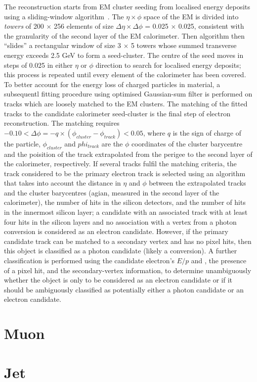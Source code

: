 The reconstruction starts from EM cluster seeding from localised energy deposits 
using a sliding-window algorithm~\cite{sliding-window}.
The $\eta \times \phi$ space of the EM is divided into \textit{towers} of 200 $\times$ 256
elements of size $\Delta\eta \times \Delta\phi$ = 0.025 $\times$ 0.025, consistent with the
granularity of the second layer of the EM calorimeter. Then algorithm then ``slides'' a rectangular
window of size 3 $\times$ 5 towers whose summed transverse energy exceeds 2.5 GeV to form a seed-cluster.
The centre of the seed moves in steps of 0.025 in either $\eta$ or $\phi$ direction to search for localised
energy deposits; this process is repeated until every element of the calorimeter has been covered.
To better account for the energy loss of charged particles in material, a subsequentl fitting procedure
using optimised Gaussian-sum filter \cite{ATLAS-CONF-2012-047} is performed on tracks which are loosely 
matched to the EM clusters. The matching of the fitted tracks to the candidate calorimeter seed-cluster
is the final step of electron reconstruction. 
The matching requires $-0.10 < \Delta\phi = -q \times (\phi_{cluster} - \phi_{track}) < 0.05$, 
where $q$ is the sign of charge of the particle, $\phi_{cluster}$ and $phi_{track}$ are the 
$\phi$ coordinates of the cluster barycentre and the poisition of the track extrapolated from the 
perigee to the second layer of the calorimeter, respectively. 
If several tracks fulfil the matching criteria, the track considered to
be the primary electron track is selected using an algorithm that takes into account the distance in $\eta$
and $\phi$ between the extrapolated tracks and the cluster barycentres (agian, measured in the second layer of the
calorimeter), 
the number of hits in the silicon detectors, 
and the number of hits in the innermost silicon layer; 
a candidate with an associated track with at least four hits in the silicon layers and no association
with a vertex from a photon conversion is considered as an electron candidate. 
However, if the primary candidate track can be matched to a secondary vertex and has no pixel hits, 
then this object is classified as a photon candidate (likely a conversion). 
A further classification is performed using the candidate electron’s $E/p$ and \pt, 
the presence of a pixel hit, and the secondary-vertex information, to determine
unambiguously whether the object is only to be considered as an electron candidate or if it should be
ambiguously classified as potentially either a photon candidate or an electron candidate.




\section{Muon}
\section{Jet}
